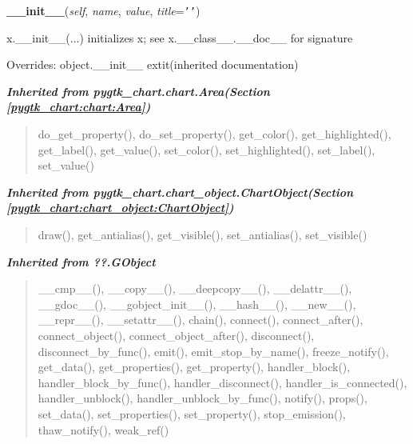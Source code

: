     \vspace{0.5ex}

\hspace{.8\funcindent}\begin{boxedminipage}{\funcwidth}

    \raggedright \textbf{\_\_init\_\_}(\textit{self}, \textit{name}, \textit{value}, \textit{title}={\tt \texttt{'}\texttt{}\texttt{'}})

\setlength{\parskip}{2ex}
    x.\_\_init\_\_(...) initializes x; see x.\_\_class\_\_.\_\_doc\_\_ for 
    signature

\setlength{\parskip}{1ex}
      Overrides: object.\_\_init\_\_ 	extit{(inherited documentation)}

    \end{boxedminipage}


\large{\textbf{\textit{Inherited from pygtk\_chart.chart.Area\textit{(Section \ref{pygtk_chart:chart:Area})}}}}

\begin{quote}
do\_get\_property(), do\_set\_property(), get\_color(), get\_highlighted(), get\_label(), get\_value(), set\_color(), set\_highlighted(), set\_label(), set\_value()
\end{quote}

\large{\textbf{\textit{Inherited from pygtk\_chart.chart\_object.ChartObject\textit{(Section \ref{pygtk_chart:chart_object:ChartObject})}}}}

\begin{quote}
draw(), get\_antialias(), get\_visible(), set\_antialias(), set\_visible()
\end{quote}

\large{\textbf{\textit{Inherited from ??.GObject}}}

\begin{quote}
\_\_cmp\_\_(), \_\_copy\_\_(), \_\_deepcopy\_\_(), \_\_delattr\_\_(), \_\_gdoc\_\_(), \_\_gobject\_init\_\_(), \_\_hash\_\_(), \_\_new\_\_(), \_\_repr\_\_(), \_\_setattr\_\_(), chain(), connect(), connect\_after(), connect\_object(), connect\_object\_after(), disconnect(), disconnect\_by\_func(), emit(), emit\_stop\_by\_name(), freeze\_notify(), get\_data(), get\_properties(), get\_property(), handler\_block(), handler\_block\_by\_func(), handler\_disconnect(), handler\_is\_connected(), handler\_unblock(), handler\_unblock\_by\_func(), notify(), props(), set\_data(), set\_properties(), set\_property(), stop\_emission(), thaw\_notify(), weak\_ref()
\end{quote}

